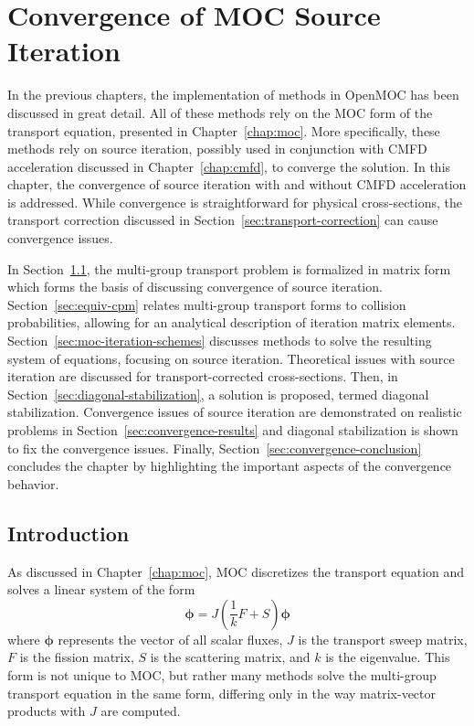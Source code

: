 \chapter{Convergence of MOC Source Iteration}
\label{chap:moc-convergence}

In the previous chapters, the implementation of methods in OpenMOC has been discussed in great detail. All of these methods rely on the \ac{MOC} form of the transport equation, presented in Chapter~\ref{chap:moc}. More specifically, these methods rely on source iteration, possibly used in conjunction with \ac{CMFD} acceleration discussed in Chapter~\ref{chap:cmfd}, to converge the solution. In this chapter, the convergence of source iteration with and without \ac{CMFD} acceleration is addressed. While convergence is straightforward for physical cross-sections, the transport correction discussed in Section~\ref{sec:transport-correction} can cause convergence issues. 

In Section~\ref{sec:source-iteration-intro}, the multi-group transport problem is formalized in matrix form which forms the basis of discussing convergence of source iteration. Section~\ref{sec:equiv-cpm} relates multi-group transport forms to collision probabilities, allowing for an analytical description of iteration matrix elements. Section~\ref{sec:moc-iteration-schemes} discusses methods to solve the resulting system of equations, focusing on source iteration. Theoretical issues with source iteration are discussed for transport-corrected cross-sections. Then, in Section~\ref{sec:diagonal-stabilization}, a solution is proposed, termed diagonal stabilization. Convergence issues of source iteration are demonstrated on realistic problems in Section~\ref{sec:convergence-results} and diagonal stabilization is shown to fix the convergence issues. Finally, Section~\ref{sec:convergence-conclusion} concludes the chapter by highlighting the important aspects of the convergence behavior.

\section{Introduction}
\label{sec:source-iteration-intro}

As discussed in Chapter~\ref{chap:moc}, \ac{MOC} discretizes the transport equation and solves a linear system of the form
\begin{equation}
	\boldsymbol{\phi} = J \left(\frac{1}{k} F + S \right) \boldsymbol{\phi}
	\label{eq:si-transport}
\end{equation}
where $\boldsymbol{\phi}$ represents the vector of all scalar fluxes, $J$ is the transport sweep matrix, $F$ is the fission matrix, $S$ is the scattering matrix, and $k$ is the eigenvalue. This form is not unique to \ac{MOC}, but rather many methods solve the multi-group transport equation in the same form, differing only in the way matrix-vector products with $J$ are computed.

